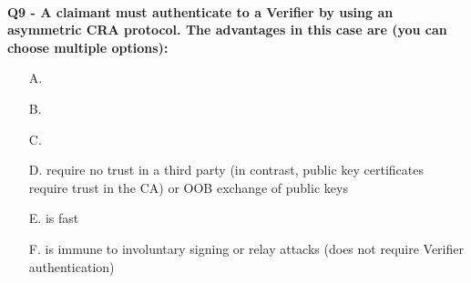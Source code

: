 \textbf{\\Q9 - A claimant must authenticate to a Verifier by using an asymmetric CRA protocol. The advantages in this case are (you can choose multiple options):}
\begin{enumerate}
    \item[A.] 
    \item[B.] 
    \item[C.] 
    \item[D.] require no trust in a third party (in contrast, public key certificates require trust in the CA) or OOB exchange of public keys
    \item[E.] is fast
    \item[F.] is immune to involuntary signing or relay attacks (does not require Verifier authentication)
\end{enumerate}
